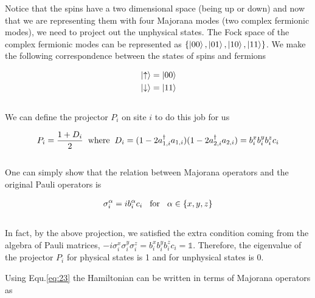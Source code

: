 \documentclass{article}
\begin{document}
Notice that the spins have a two dimensional space (being up or down) and now that we are representing them with four Majorana modes (two complex fermionic modes), we need to project out the unphysical states. The Fock space of the complex fermionic modes can be represented as $\{\ket{00}, \ket{01}, \ket{10}, \ket{11}\}$. We make the following correspondence between the states of spins and fermions 

\begin{equation}\label{eq:21}
    \begin{aligned}
        & \ket{\uparrow} = \ket{00} \\
        & \ket{\downarrow} = \ket{11}
    \end{aligned}
\end{equation}{}\\

We can define the projector $P_i$ on site $i$ to do this job for us

\begin{equation}\label{eq:22}
    \begin{aligned}
        P_i = \frac{1+D_i}{2} \hspace{2mm}\text{where}\hspace{2mm} D_i = (1-2a^\dagger_{1,i}a_{1,i})(1-2a^\dagger_{2,i}a_{2,i}) = b^x_i b^y_i b^z_i c_i
    \end{aligned}
\end{equation}{}\\

One can simply show that the relation between Majorana operators and the original Pauli operators is

\begin{equation}\label{eq:23}
    \begin{aligned}
        \sigma^\alpha_i = i b^\alpha_i c_i \hspace{3mm}\text{for}\hspace{3mm} \alpha\in \{x,y,z\}\\
    \end{aligned}
\end{equation}{}\\

In fact, by the above projection, we satisfied the extra condition coming from the algebra of Pauli matrices, $-i\sigma^x_i\sigma^y_i\sigma^z_i = b^x_i b^y_i b^z_i c_i = \mathbb{1}$. Therefore, the eigenvalue of the projector $P_i$ for physical states is 1 and for unphysical states is 0.

Using Equ.\hspace{0.2mm}\ref{eq:23} the Hamiltonian can be written in terms of Majorana operators as
\end{document}
